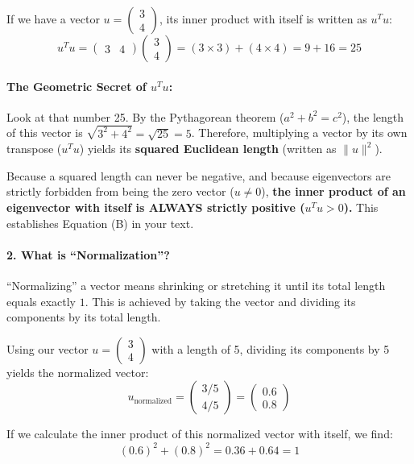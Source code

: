 \documentclass{article}
\begin{document}
If we have a vector $u = \begin{pmatrix} 3 \\ 4 \end{pmatrix}$, its inner product with itself is written as $u^T u$:
\[ u^T u = \begin{pmatrix} 3 & 4 \end{pmatrix} \begin{pmatrix} 3 \\ 4 \end{pmatrix} = (3 \times 3) + (4 \times 4) = 9 + 16 = 25 \]

\paragraph{The Geometric Secret of $u^T u$:}
Look at that number 25. By the Pythagorean theorem ($a^2 + b^2 = c^2$), the length of this vector is $\sqrt{3^2 + 4^2} = \sqrt{25} = 5$. Therefore, multiplying a vector by its own transpose ($u^T u$) yields its \textbf{squared Euclidean length} (written as $\|u\|^2$). 

Because a squared length can never be negative, and because eigenvectors are strictly forbidden from being the zero vector ($u \neq 0$), \textbf{the inner product of an eigenvector with itself is ALWAYS strictly positive ($u^T u > 0$).} This establishes Equation (B) in your text.

\paragraph{2. What is ``Normalization''?}
``Normalizing'' a vector means shrinking or stretching it until its total length equals exactly $1$. This is achieved by taking the vector and dividing its components by its total length.

Using our vector $u = \begin{pmatrix} 3 \\ 4 \end{pmatrix}$ with a length of 5, dividing its components by 5 yields the normalized vector:
\[ u_{\text{normalized}} = \begin{pmatrix} 3/5 \\ 4/5 \end{pmatrix} = \begin{pmatrix} 0.6 \\ 0.8 \end{pmatrix} \]

If we calculate the inner product of this normalized vector with itself, we find:
\[ (0.6)^2 + (0.8)^2 = 0.36 + 0.64 = 1 \]
\end{document}
